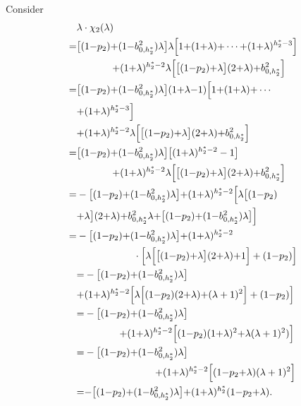 \documentclass[11pt,twocolumn]{IEEEtran}
\begin{document}
Consider
\begin{align}
&\lambda \cdot \chi_2(\lambda)\nonumber\\
{=}&\big[(1{-}p_2){+}(1{-}b_{0, h^*_2}^2)\lambda \big]\lambda \Big[1{+}(1{+}\lambda){+}\cdots {+} (1{+}\lambda)^{h^*_2{-}3} \Big]\nonumber\\
&\hspace{0.5in} {+} (1{+}\lambda)^{h^*_2{-}2} \lambda \Big[\big[(1{-}p_2){+}\lambda \big](2{+}\lambda){+} b_{0, h^*_2}^2 \Big]\nonumber \\
{=}&\big[(1{-}p_2){+}(1{-}b_{0, h^*_2}^2)\lambda \big](1{+}\lambda{-}1) \Big[1{+}(1{+}\lambda){+}\cdots\nonumber\\
&{+}(1{+}\lambda)^{h^*_2{-}3} \Big]\nonumber\\
&{+}(1{+}\lambda)^{h^*_2{-}2} \lambda \Big[\big[(1{-}p_2){+}\lambda \big](2{+}\lambda){+} b_{0, h^*_2}^2\Big] \nonumber \\
{=}&\big[(1{-}p_2){+}(1{-}b_{0, h^*_2}^2)\lambda \big]\big[(1{+}\lambda)^{h^*_2-2}-1\big]\nonumber\\
&\hspace{0.5in} {+}(1{+}\lambda)^{h^*_2{-}2} \lambda\Big[ \big[(1{-}p_2){+}\lambda \big](2{+}\lambda){+} b_{0, h^*_2}^2 \Big]\nonumber \\
{=}&-\big[(1{-}p_2){+}(1{-}b_{0, h^*_2}^2)\lambda \big]{+}(1{+}\lambda)^{h^*_2{-}2}\Big[\lambda \big[(1{-}p_2)\nonumber\\
&{+}\lambda \big](2{+}\lambda){+}b_{0, h^*_2}^2 \lambda{+}\big[(1{-}p_2){+}(1{-}b_{0, h^*_2}^2)\lambda \big] \Big]\nonumber \\
{=}&-\big[(1{-}p_2){+}(1{-}b_{0, h^*_2}^2)\lambda \big] {+}(1{+}\lambda)^{h^*_2{-}2}\nonumber\\
&\hspace{0.8in}\cdot\Big[\lambda\Big[ \big[(1{-}p_2){+}\lambda \big](2{+}\lambda){+} 1 \Big]+(1{-}p_2)\Big]\nonumber \\
&{=}-\big[(1{-}p_2){+}(1{-}b_{0, h^*_2}^2)\lambda \big]\nonumber\\
&{+}(1{+}\lambda)^{h^*_2{-}2} \Big[\lambda\Big[ (1{-}p_2)(2{+}\lambda){+} (\lambda+1)^2 \Big]+(1{-}p_2)\Big]\nonumber \\
&{=}-\big[(1{-}p_2){+}(1{-}b_{0, h^*_2}^2)\lambda \big]\hspace{1in}\nonumber\\
&\hspace{0.6in}{+}(1{+}\lambda)^{h^*_2{-}2} \Big[ (1{-}p_2)(1{+}\lambda)^2{+} \lambda(\lambda+1)^2 )\Big]\nonumber \\
&{=}-\big[(1{-}p_2){+}(1{-}b_{0, h^*_2}^2)\lambda \big]\nonumber\\
&\hspace{1.1in} {+}(1{+}\lambda)^{h^*_2{-}2} \Big[(1{-}p_2{+}\lambda)(\lambda+1)^2 \Big] \nonumber \\
&{=}{-}\big[(1{-}p_2){+}(1{-}b_{0, h^*_2}^2)\lambda \big] {+}(1{+}\lambda)^{h^*_2} (1{-}p_2{+}\lambda).\label{eq:lambdah}
\end{align}
\end{document}
